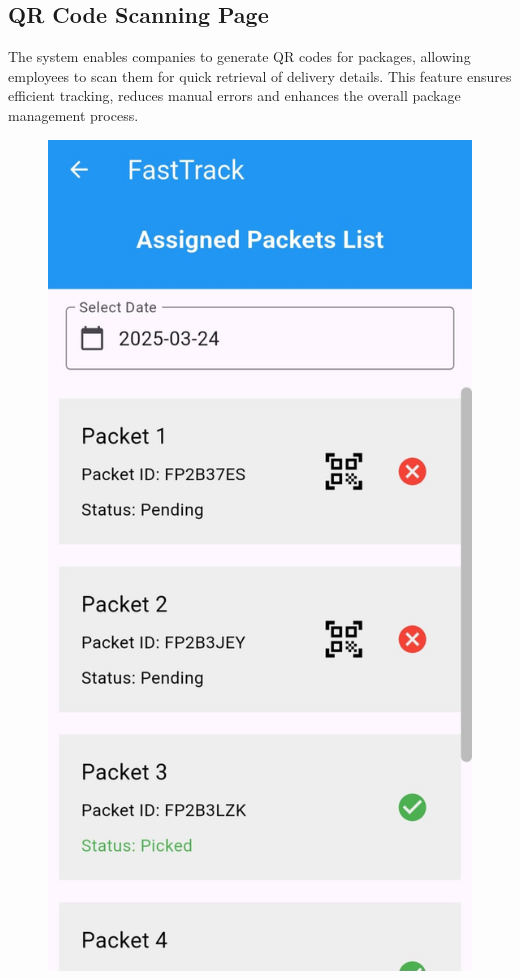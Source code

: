 \subsection{QR Code Scanning Page}
The system enables companies to generate QR codes for packages, allowing employees to scan them for quick retrieval of delivery details. This feature ensures efficient tracking, reduces manual errors and enhances the overall package management process.

\begin{figure}[H]
\centering
\begin{minipage}{0.24\textwidth}
    \centering
    \includegraphics[width=\linewidth]{6/qr1.jpg}

\end{minipage}
\end{figure}
